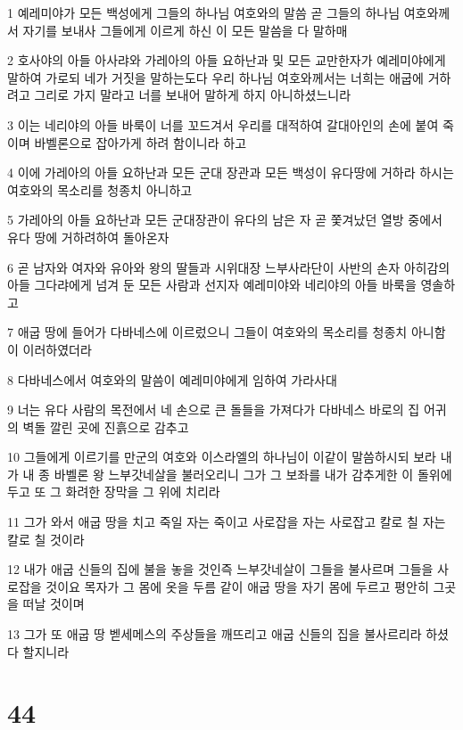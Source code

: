 \par 1 예레미야가 모든 백성에게 그들의 하나님 여호와의 말씀 곧 그들의 하나님 여호와께서 자기를 보내사 그들에게 이르게 하신 이 모든 말씀을 다 말하매
\par 2 호사야의 아들 아사랴와 가레아의 아들 요하난과 및 모든 교만한자가 예레미야에게 말하여 가로되 네가 거짓을 말하는도다 우리 하나님 여호와께서는 너희는 애굽에 거하려고 그리로 가지 말라고 너를 보내어 말하게 하지 아니하셨느니라
\par 3 이는 네리야의 아들 바룩이 너를 꼬드겨서 우리를 대적하여 갈대아인의 손에 붙여 죽이며 바벨론으로 잡아가게 하려 함이니라 하고
\par 4 이에 가레아의 아들 요하난과 모든 군대 장관과 모든 백성이 유다땅에 거하라 하시는 여호와의 목소리를 청종치 아니하고
\par 5 가레아의 아들 요하난과 모든 군대장관이 유다의 남은 자 곧 쫓겨났던 열방 중에서 유다 땅에 거하려하여 돌아온자
\par 6 곧 남자와 여자와 유아와 왕의 딸들과 시위대장 느부사라단이 사반의 손자 아히감의 아들 그다랴에게 넘겨 둔 모든 사람과 선지자 예레미야와 네리야의 아들 바룩을 영솔하고
\par 7 애굽 땅에 들어가 다바네스에 이르렀으니 그들이 여호와의 목소리를 청종치 아니함이 이러하였더라
\par 8 다바네스에서 여호와의 말씀이 예레미야에게 임하여 가라사대
\par 9 너는 유다 사람의 목전에서 네 손으로 큰 돌들을 가져다가 다바네스 바로의 집 어귀의 벽돌 깔린 곳에 진흙으로 감추고
\par 10 그들에게 이르기를 만군의 여호와 이스라엘의 하나님이 이같이 말씀하시되 보라 내가 내 종 바벨론 왕 느부갓네살을 불러오리니 그가 그 보좌를 내가 감추게한 이 돌위에 두고 또 그 화려한 장막을 그 위에 치리라
\par 11 그가 와서 애굽 땅을 치고 죽일 자는 죽이고 사로잡을 자는 사로잡고 칼로 칠 자는 칼로 칠 것이라
\par 12 내가 애굽 신들의 집에 불을 놓을 것인즉 느부갓네살이 그들을 불사르며 그들을 사로잡을 것이요 목자가 그 몸에 옷을 두름 같이 애굽 땅을 자기 몸에 두르고 평안히 그곳을 떠날 것이며
\par 13 그가 또 애굽 땅 벧세메스의 주상들을 깨뜨리고 애굽 신들의 집을 불사르리라 하셨다 할지니라

\chapter{44}

